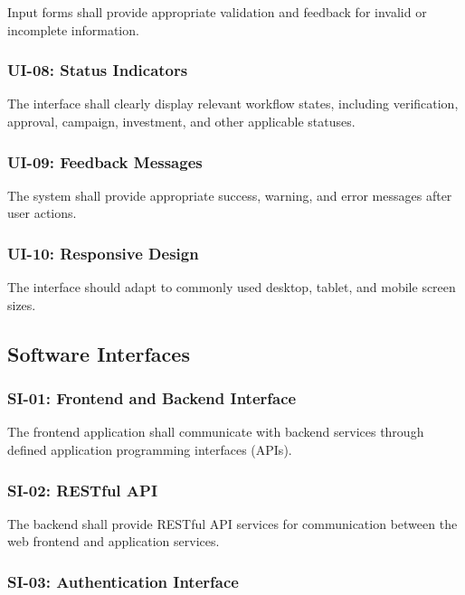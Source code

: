 Input forms shall provide appropriate validation and feedback for invalid
or incomplete information.

\subsubsection{UI-08: Status Indicators}

The interface shall clearly display relevant workflow states, including
verification, approval, campaign, investment, and other applicable
statuses.

\subsubsection{UI-09: Feedback Messages}

The system shall provide appropriate success, warning, and error messages
after user actions.

\subsubsection{UI-10: Responsive Design}

The interface should adapt to commonly used desktop, tablet, and mobile
screen sizes.



\subsection{Software Interfaces}

\subsubsection{SI-01: Frontend and Backend Interface}

The frontend application shall communicate with backend services through
defined application programming interfaces (APIs).

\subsubsection{SI-02: RESTful API}

The backend shall provide RESTful API services for communication between
the web frontend and application services.

\subsubsection{SI-03: Authentication Interface}

